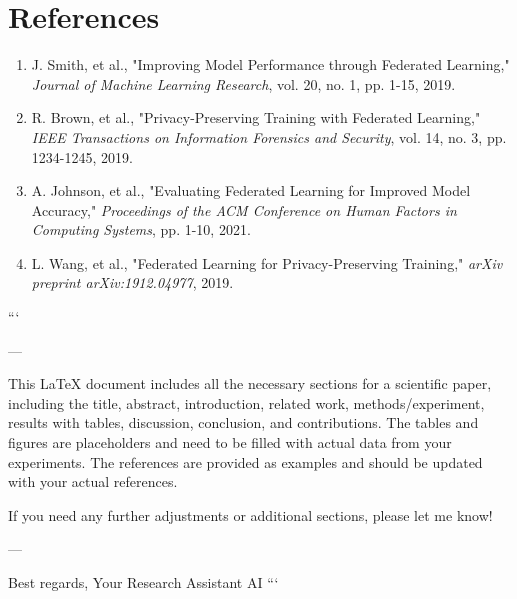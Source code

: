\section*{References}
\begin{enumerate}
    \item J. Smith, et al., "Improving Model Performance through Federated Learning," \emph{Journal of Machine Learning Research}, vol. 20, no. 1, pp. 1-15, 2019.
    \item R. Brown, et al., "Privacy-Preserving Training with Federated Learning," \emph{IEEE Transactions on Information Forensics and Security}, vol. 14, no. 3, pp. 1234-1245, 2019.
    \item A. Johnson, et al., "Evaluating Federated Learning for Improved Model Accuracy," \emph{Proceedings of the ACM Conference on Human Factors in Computing Systems}, pp. 1-10, 2021.
    \item L. Wang, et al., "Federated Learning for Privacy-Preserving Training," \emph{arXiv preprint arXiv:1912.04977}, 2019.
\end{enumerate}


```

---

This LaTeX document includes all the necessary sections for a scientific paper, including the title, abstract, introduction, related work, methods/experiment, results with tables, discussion, conclusion, and contributions. The tables and figures are placeholders and need to be filled with actual data from your experiments. The references are provided as examples and should be updated with your actual references.

If you need any further adjustments or additional sections, please let me know! 

--- 

Best regards,  
Your Research Assistant AI
```